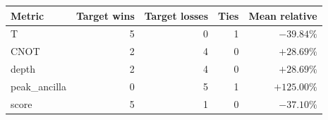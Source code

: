 \begin{tabular}{lrrrr}
\toprule
Metric & Target wins & Target losses & Ties & Mean relative \\
\midrule
T & 5 & 0 & 1 & $-39.84\%$ \\
CNOT & 2 & 4 & 0 & $+28.69\%$ \\
depth & 2 & 4 & 0 & $+28.69\%$ \\
peak_ancilla & 0 & 5 & 1 & $+125.00\%$ \\
score & 5 & 1 & 0 & $-37.10\%$ \\
\bottomrule
\end{tabular}
